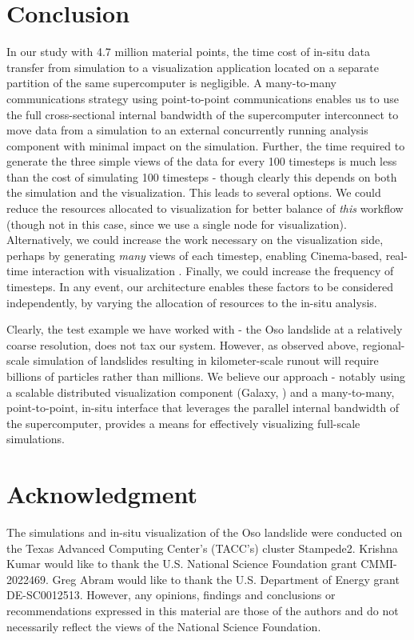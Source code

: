\documentclass[journal]{IEEEtran}
\begin{document}
\section{Conclusion}

In our study with 4.7 million material points, the time cost of in-situ data transfer from simulation to a visualization application located on a separate partition of the same supercomputer is negligible.   A many-to-many communications strategy using point-to-point communications enables us to use the full cross-sectional internal bandwidth of the supercomputer interconnect to move data from a simulation to an external concurrently running analysis component with minimal impact on the simulation.  
Further, the time required to generate the three simple views of the data for every 100 timesteps is much less than the cost of simulating 100 timesteps - though clearly this depends on both the simulation and the visualization.   This leads to several options.  We could reduce the resources allocated to visualization for better balance of \textit{this} workflow (though not in this case, since we use a single node for visualization).  Alternatively, we could increase the work necessary on the visualization side, perhaps by generating \textit{many} views of each timestep, enabling Cinema-based, real-time interaction with visualization \cite{Ahrens2014cinema}.   Finally, we could increase the frequency of timesteps.    In any event, our architecture enables these factors to be considered independently, by varying the allocation of resources to the in-situ analysis.

Clearly, the test example we have worked with - the Oso landslide at a relatively coarse resolution, does not tax our system.   However, as observed above, regional-scale simulation of landslides resulting in kilometer-scale runout will require billions of particles rather than millions.   We believe our approach - notably using a scalable distributed visualization component (Galaxy, \cite{abram2018galaxy}) and a many-to-many, point-to-point, in-situ interface that leverages the parallel internal bandwidth of the supercomputer, provides a means for effectively visualizing full-scale simulations.

\appendices

\section*{Acknowledgment}
The simulations and in-situ visualization of the Oso landslide were conducted on the Texas Advanced Computing Center’s (TACC’s) cluster Stampede2.  Krishna Kumar would like to thank the U.S. National Science Foundation grant CMMI-2022469. Greg Abram would like to thank the U.S. Department of Energy grant DE-SC0012513. However, any opinions, 
findings and conclusions or recommendations expressed in this material are those of the authors and do not necessarily reflect the views of the National Science Foundation.
\end{document}
